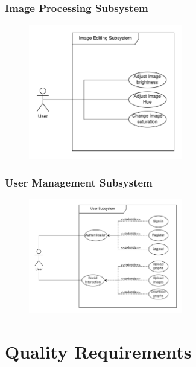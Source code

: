 \documentclass[11pt,a4paper]{article}
\begin{document}
\subsubsection*{Image Processing Subsystem}
\begin{figure}[htbp]
    \centering
    \href{https://drive.google.com/drive/u/2/folders/18FJi5U-PEzTiB-SsYfPQOV304R0K7s3H}
    {\includegraphics[width=0.6\textwidth]{../diagramPng/UseCase Image-Subsystem.png}}
\end{figure}

\subsubsection*{User Management Subsystem}
\begin{figure}[htbp]
    \centering
    \href{https://drive.google.com/drive/u/2/folders/18FJi5U-PEzTiB-SsYfPQOV304R0K7s3H}
    {\includegraphics[width=0.6\textwidth]{../diagramPng/Usecase User-Subsystem.png}}
\end{figure}


\pagebreak

\section*{Quality Requirements}
\end{document}
